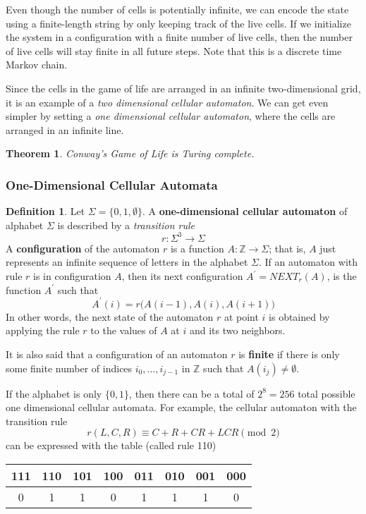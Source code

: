 \documentclass[a4paper, 12pt]{report}
\newtheorem{theorem}{Theorem}[section]
\theoremstyle{remark}
\theoremstyle{definition}
\newtheorem{definition}{Definition}[section]
\begin{document}
Even though the number of cells is potentially infinite, we can encode the state using a finite-length string by only keeping track of the live cells. If we initialize the system in a configuration with a finite number of live cells, then the number of live cells will stay finite in all future steps. Note that this is a discrete time Markov chain. 

Since the cells in the game of life are arranged in an infinite two-dimensional grid, it is an example of a \textit{two dimensional cellular automaton}. We can get even simpler by setting a \textit{one dimensional cellular automaton}, where the cells are arranged in an infinite line. 

\begin{theorem}
Conway's Game of Life is Turing complete. 
\end{theorem}

\subsubsection{One-Dimensional Cellular Automata}
\begin{definition}
Let $\Sigma = \{0, 1, \emptyset\}$. A \textbf{one-dimensional cellular automaton} of alphabet $\Sigma$ is described by a \textit{transition rule}
\[r: \Sigma^3 \longrightarrow \Sigma\]
A \textbf{configuration} of the automaton $r$ is a function $A: \mathbb{Z} \longrightarrow \Sigma$; that is, $A$ just represents an infinite sequence of letters in the alphabet $\Sigma$. If an automaton with rule $r$ is in configuration $A$, then its next configuration $A^\prime = NEXT_r (A)$, is the function $A^\prime$ such that 
\[A^\prime (i) = r\big( A(i-1), A(i), A(i+1)\big)\]
In other words, the next state of the automaton $r$ at point $i$ is obtained by applying the rule $r$ to the values of $A$ at $i$ and its two neighbors. 

It is also said that a configuration of an automaton $r$ is \textbf{finite} if there is only some finite number of indices $i_0, ..., i_{j-1}$ in $\mathbb{Z}$ such that $A(i_j) \neq \emptyset$. 
\end{definition}

If the alphabet is only $\{0, 1\}$, then there can be a total of $2^8 = 256$ total possible one dimensional cellular automata. For example, the cellular automaton with the transition rule
\[r(L, C, R) \equiv C + R + CR + LCR \pmod{2}\]
can be expressed with the table (called rule 110)

\begin{center}
\begin{tabular}{c|c|c|c|c|c|c|c}
    111	&110	&101	&100	&011	&010	&001	&000 \\
    \hline
    0&1&1&0&1&1&1&0
\end{tabular}
\end{center}
\end{document}
